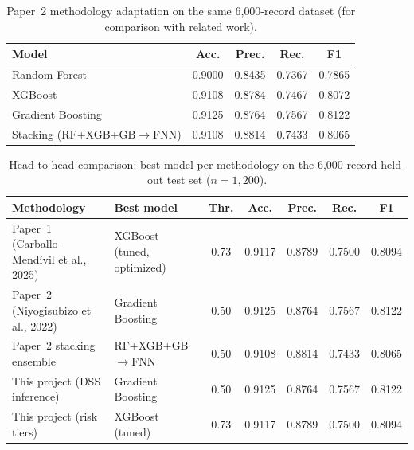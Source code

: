 \begin{table}[htbp]
\centering
\caption{Paper~2 methodology adaptation on the same 6{,}000-record dataset
(for comparison with related work).}
\label{tab:paper2_comparison}
\begin{tabular}{lcccc}
\toprule
\textbf{Model} & \textbf{Acc.} & \textbf{Prec.} & \textbf{Rec.} & \textbf{F1} \\
\midrule
Random Forest & 0.9000 & 0.8435 & 0.7367 & 0.7865 \\
XGBoost & 0.9108 & 0.8784 & 0.7467 & 0.8072 \\
Gradient Boosting & 0.9125 & 0.8764 & 0.7567 & 0.8122 \\
Stacking (RF+XGB+GB$\rightarrow$FNN) & 0.9108 & 0.8814 & 0.7433 & 0.8065 \\
\bottomrule
\end{tabular}
\end{table}


\begin{table}[htbp]
\centering
\caption{Head-to-head comparison: best model per methodology on the 6{,}000-record held-out test set ($n=1{,}200$).}
\label{tab:methodology_head_to_head}
\begin{tabular}{lp{4.2cm}ccccc}
\toprule
\textbf{Methodology} & \textbf{Best model} & \textbf{Thr.} & \textbf{Acc.} & \textbf{Prec.} & \textbf{Rec.} & \textbf{F1} \\
\midrule
Paper~1 (Carballo-Mend\'ivil et al., 2025)
  & XGBoost (tuned, optimized) & 0.73 & 0.9117 & 0.8789 & 0.7500 & 0.8094 \\
Paper~2 (Niyogisubizo et al., 2022)
  & Gradient Boosting & 0.50 & 0.9125 & 0.8764 & 0.7567 & 0.8122 \\
Paper~2 stacking ensemble
  & RF+XGB+GB$\rightarrow$FNN & 0.50 & 0.9108 & 0.8814 & 0.7433 & 0.8065 \\
This project (DSS inference)
  & Gradient Boosting & 0.50 & 0.9125 & 0.8764 & 0.7567 & 0.8122 \\
This project (risk tiers)
  & XGBoost (tuned) & 0.73 & 0.9117 & 0.8789 & 0.7500 & 0.8094 \\
\bottomrule
\end{tabular}
\end{table}

